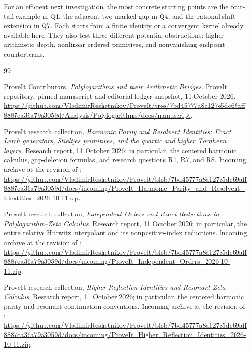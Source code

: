 \documentclass[11pt,letterpaper]{article}
\numberwithin{equation}{section}
\theoremstyle{plain}
\theoremstyle{definition}
\theoremstyle{remark}
\begin{document}
\medskip
For an efficient next investigation, the most concrete starting points
are the four-tail example in Q1, the adjacent two-marked gap in Q4,
and the rational-shift extension in Q7. Each starts from a finite
identity or a convergent kernel already available here. They also test
three different potential obstructions: higher arithmetic depth,
nonlinear ordered primitives, and nonvanishing endpoint counterterms.


\begin{thebibliography}{99}

ProveIt Contributors,
\emph{Polylogarithms and their Arithmetic Bridges}.
ProveIt repository, pinned manuscript and editorial-ledger snapshot,
11 October 2026.
\url{https://github.com/VladimirReshetnikov/ProveIt/tree/7bd45777a8a127e5dc69aff8887ca36a79a3059d/Analysis/Polylogarithms/docs/manuscript}.

ProveIt research collection,
\emph{Harmonic Parity and Resolvent Identities:
Exact Lerch generators, Stieltjes primitives, and the quartic and higher
Tornheim layers}.
Research report, 11 October 2026; in particular, the centered harmonic
calculus, gap-deletion formulas, and research questions R1, R7, and R8.
Incoming archive at the revision of \cite{Repository}:
\url{https://github.com/VladimirReshetnikov/ProveIt/blob/7bd45777a8a127e5dc69aff8887ca36a79a3059d/docs/incoming/ProveIt_Harmonic_Parity_and_Resolvent_Identities_2026-10-11.zip}.

ProveIt research collection,
\emph{Independent Orders and Exact Reductions in Polylogarithm--Zeta
Calculus}.
Research report, 11 October 2026; in particular, the entire relative
Hurwitz interpolant and its nonpositive-index reductions.
Incoming archive at the revision of \cite{Repository}:
\url{https://github.com/VladimirReshetnikov/ProveIt/blob/7bd45777a8a127e5dc69aff8887ca36a79a3059d/docs/incoming/ProveIt_Independent_Orders_2026-10-11.zip}.

ProveIt research collection,
\emph{Higher Reflection Identities and Resonant Zeta Calculus}.
Research report, 11 October 2026; in particular, the centered harmonic
parity and resonant-continuation conventions.
Incoming archive at the revision of \cite{Repository}:
\url{https://github.com/VladimirReshetnikov/ProveIt/blob/7bd45777a8a127e5dc69aff8887ca36a79a3059d/docs/incoming/ProveIt_Higher_Reflection_Identities_2026-10-11.zip}.


\end{thebibliography}
\end{document}
